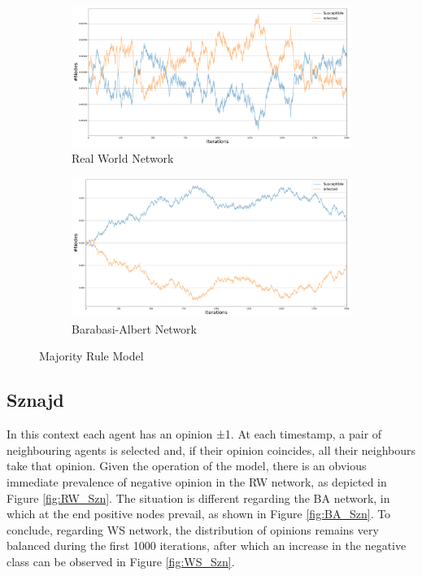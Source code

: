 \documentclass[sigchi]{acmart}
\begin{document}
\begin{figure}[h]
\centering
\begin{subfigure}[H]{1\columnwidth}
    \centering
   \includegraphics[width=.9\linewidth]{report/img/OD/MajorityRule_0.5.pdf}
   \caption{Real World Network}
   \label{fig:RW_MR} 
\end{subfigure}

\begin{subfigure}[H]{1\columnwidth}
   \centering
   \includegraphics[width=.9\linewidth]{report/img/OD/MajorityRuleBA_0.5.pdf}
   \caption{Barabasi-Albert Network}
   \label{fig:BA_MR}
\end{subfigure}

\caption{Majority Rule Model}
\label{fig:MajorityRule}
\end{figure}

\subsection{Sznajd}
In this context each agent has an opinion ±1. At each timestamp, a pair of neighbouring agents is selected and, if their opinion coincides, all their neighbours take that opinion. 
Given the operation of the model, there is an obvious immediate prevalence of negative opinion in the RW network, as depicted in Figure \ref{fig:RW_Szn}. The situation is different regarding the BA network, in which at the end positive nodes prevail, as shown in Figure \ref{fig:BA_Szn}. To conclude, regarding WS network, the distribution of opinions remains very balanced during the first 1000 iterations, after which an increase in the negative class can be observed in Figure \ref{fig:WS_Szn}.
\end{document}
